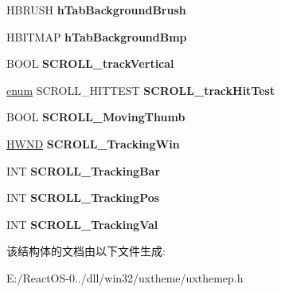 \begin{DoxyCompactItemize}
H\+B\+R\+U\+SH {\bfseries h\+Tab\+Background\+Brush}
\item 
\mbox{\label{struct___w_n_d___d_a_t_a_ab368daefdc9c3527776bb66f4b452237}} 
H\+B\+I\+T\+M\+AP {\bfseries h\+Tab\+Background\+Bmp}
\item 
\mbox{\label{struct___w_n_d___d_a_t_a_a9e3752672b0775e4b640d8329df3d506}} 
B\+O\+OL {\bfseries S\+C\+R\+O\+L\+L\+\_\+track\+Vertical}
\item 
\mbox{\label{struct___w_n_d___d_a_t_a_a46fcef2463653c934a1cb4ebbf503520}} 
\hyperlink{interfaceenum}{enum} S\+C\+R\+O\+L\+L\+\_\+\+H\+I\+T\+T\+E\+ST {\bfseries S\+C\+R\+O\+L\+L\+\_\+track\+Hit\+Test}
\item 
\mbox{\label{struct___w_n_d___d_a_t_a_aeec56aa64b2a541d7dbfbc5abedd8938}} 
B\+O\+OL {\bfseries S\+C\+R\+O\+L\+L\+\_\+\+Moving\+Thumb}
\item 
\mbox{\label{struct___w_n_d___d_a_t_a_ac4f8fd0d38ecef0cd580a6214cd92332}} 
\hyperlink{interfacevoid}{H\+W\+ND} {\bfseries S\+C\+R\+O\+L\+L\+\_\+\+Tracking\+Win}
\item 
\mbox{\label{struct___w_n_d___d_a_t_a_a0ad9c992c85769bf1efcb9326582376e}} 
I\+NT {\bfseries S\+C\+R\+O\+L\+L\+\_\+\+Tracking\+Bar}
\item 
\mbox{\label{struct___w_n_d___d_a_t_a_a389a2551b577f0655ae60e6cb95c1906}} 
I\+NT {\bfseries S\+C\+R\+O\+L\+L\+\_\+\+Tracking\+Pos}
\item 
\mbox{\label{struct___w_n_d___d_a_t_a_a8bab4f2e791f7375cb2826d60981bd8a}} 
I\+NT {\bfseries S\+C\+R\+O\+L\+L\+\_\+\+Tracking\+Val}
\end{DoxyCompactItemize}


该结构体的文档由以下文件生成\+:\begin{DoxyCompactItemize}
\item 
E\+:/\+React\+O\+S-\/0../dll/win32/uxtheme/uxthemep.\+h\end{DoxyCompactItemize}
